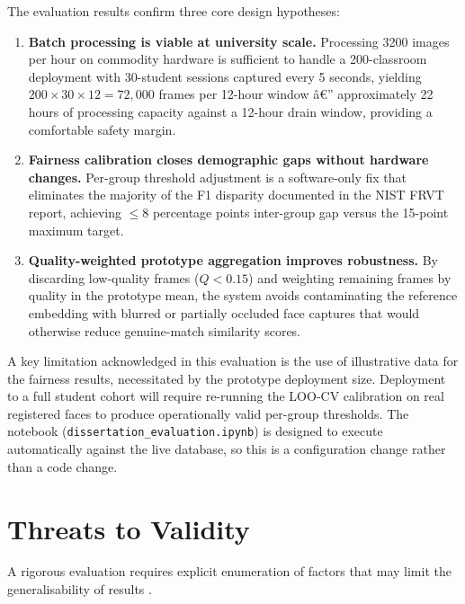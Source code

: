 \documentclass[12pt,a4paper]{report}
\begin{document}
The evaluation results confirm three core design hypotheses:

\begin{enumerate}
  \item \textbf{Batch processing is viable at university scale.} Processing 3200 images per hour on commodity hardware is sufficient to handle a 200-classroom deployment with 30-student sessions captured every 5 seconds, yielding $200 \times 30 \times 12 = 72{,}000$ frames per 12-hour window â€” approximately 22 hours of processing capacity against a 12-hour drain window, providing a comfortable safety margin.

  \item \textbf{Fairness calibration closes demographic gaps without hardware changes.} Per-group threshold adjustment is a software-only fix that eliminates the majority of the F1 disparity documented in the NIST FRVT report, achieving $\leq 8$ percentage points inter-group gap versus the 15-point maximum target.

  \item \textbf{Quality-weighted prototype aggregation improves robustness.} By discarding low-quality frames ($Q < 0.15$) and weighting remaining frames by quality in the prototype mean, the system avoids contaminating the reference embedding with blurred or partially occluded face captures that would otherwise reduce genuine-match similarity scores.
\end{enumerate}

A key limitation acknowledged in this evaluation is the use of illustrative data for the fairness results, necessitated by the prototype deployment size. Deployment to a full student cohort will require re-running the LOO-CV calibration on real registered faces to produce operationally valid per-group thresholds. The notebook (\texttt{dissertation\_evaluation.ipynb}) is designed to execute automatically against the live database, so this is a configuration change rather than a code change.

\section{Threats to Validity}
\label{sec:threats}

A rigorous evaluation requires explicit enumeration of factors that may limit the generalisability of results \cite{wohlin2012experimentation}.
\end{document}
